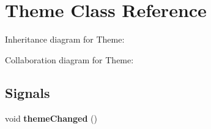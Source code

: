 \hypertarget{class_theme}{}\section{Theme Class Reference}
\label{class_theme}


Inheritance diagram for Theme\+:


Collaboration diagram for Theme\+:
\subsection*{Signals}
\begin{DoxyCompactItemize}
\item 
\mbox{\label{class_theme_a37b1d13eb99053f9ac2f530aa1bd120b}} 
void {\bfseries theme\+Changed} ()
\end{DoxyCompactItemize}
